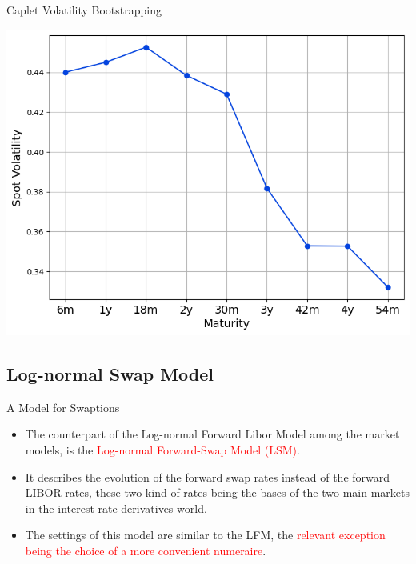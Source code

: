 \documentclass{beamer}
\begin{document}
\begin{frame}[fragile]{Caplet Volatility Bootstrapping}
	\begin{center}
\includegraphics[width=0.65\linewidth]{images/spot_volatilities}		
	\end{center}
\end{frame}



\subsection{Log-normal Swap Model}
\begin{frame}{A Model for Swaptions}
  \begin{itemize}
  \item<1-> The counterpart of the Log-normal Forward Libor Model among the market models, is the \textcolor{red}{Log-normal Forward-Swap Model (LSM)}.
  \item<2-> It describes the evolution of the forward swap rates instead of the forward LIBOR rates, these two kind of rates being the bases of the two main markets in the interest rate derivatives world. 
  \item<3-> The settings of this model are similar to the LFM, the \textcolor{red}{relevant exception being the choice of a more convenient numeraire}.
  \end{itemize}
\end{frame}
\end{document}
